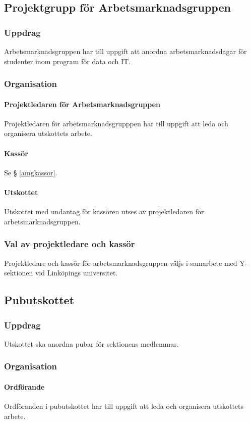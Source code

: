 \documentclass{datateknologsektionen-document}
\begin{document}
\subsection{Projektgrupp för Arbetsmarknadsgruppen}
\label{amg}
\subsubsection{Uppdrag}
Arbetsmarknadsgruppen har till uppgift att anordna arbetsmarknadsdagar för studenter inom
program för data och IT.
\subsubsection{Organisation}
\paragraph{Projektledaren för Arbetsmarknadsgruppen}
Projektledaren för arbetsmarknadsgrupppen har till uppgift att leda och organisera
utskottets arbete.
\paragraph{Kassör}
Se § \ref{amgkassor}.
\paragraph{Utskottet}
Utskottet med undantag för kassören utses av projektledaren för arbetsmarknadsgruppen.
\subsubsection{Val av projektledare och kassör}
Projektledare och kassör för arbetsmarknadsgruppen väljs i samarbete med Y-sektionen vid
Linköpings universitet.

\subsection{Pubutskottet}
\label{pubu}
\subsubsection{Uppdrag}
Utskottet ska anordna pubar för sektionens medlemmar.
\subsubsection{Organisation}
\paragraph{Ordförande}
Ordföranden i pubutskottet har till uppgift att leda och organisera utskottets arbete.
\end{document}
